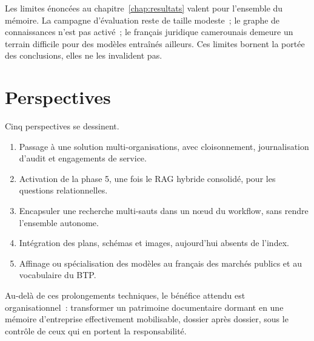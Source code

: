 Les limites énoncées au chapitre~\ref{chap:resultats} valent pour
l'ensemble du mémoire. La campagne d'évaluation reste de taille
modeste~; le graphe de connaissances n'est pas activé~; le français
juridique camerounais demeure un terrain difficile pour des modèles
entraînés ailleurs. Ces limites bornent la portée des conclusions, elles
ne les invalident pas.

\section*{Perspectives}

Cinq perspectives se dessinent.

\begin{enumerate}
  \item {} Passage à une solution multi-organisations,
        avec cloisonnement, journalisation d'audit et engagements de
        service.
  \item {} Activation de la phase 5, une
        fois le RAG hybride consolidé, pour les questions relationnelles.
  \item {} Encapsuler une
        recherche multi-sauts dans un n\oe ud du workflow, sans rendre
        l'ensemble autonome.
  \item {} Intégration des plans, schémas et images,
        aujourd'hui absents de l'index.
  \item {} Affinage ou spécialisation des
        modèles au français des marchés publics et au vocabulaire du BTP.
\end{enumerate}

Au-delà de ces prolongements techniques, le bénéfice attendu est
organisationnel~: transformer un patrimoine documentaire dormant en une
mémoire d'entreprise effectivement mobilisable, dossier après dossier,
sous le contrôle de ceux qui en portent la responsabilité.

\btpEndMark
\clearpage
